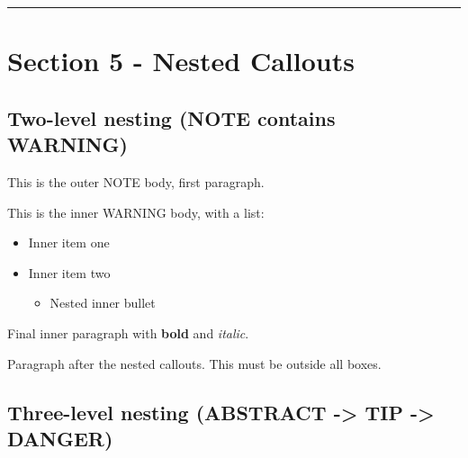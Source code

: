 \begin{tcolorbox}[breakable,colback=ocGryBack,colframe=ocGryFrame,coltitle=ocGryTitle,left=3mm,boxed title style={left=1mm},title={\hspace*{-2.5mm}\iconInfo\; md2pdf - inner with explicit \texttt{shift-heading=0}}]
\begin{center}\rule{0.5\linewidth}{0.5pt}\end{center}

\section*{Section 5 - Nested
Callouts}\label{inner-3-section-5---nested-callouts}

\subsection*{Two-level nesting (NOTE contains
WARNING)}\label{inner-3-two-level-nesting-note-contains-warning}

\begin{tcolorbox}[breakable,colback=ocGryBack,colframe=ocGryFrame,coltitle=ocGryTitle,left=3mm,boxed title style={left=1mm},title={\hspace*{-2.5mm}\iconNote\; Outer NOTE title}]

This is the outer NOTE body, first paragraph.

\begin{tcolorbox}[breakable,colback=ocOrgBack,colframe=ocOrgFrame,coltitle=ocOrgTitle,left=3mm,boxed title style={left=1mm},title={\hspace*{-2.5mm}\iconWarning\; Inner WARNING title}]

This is the inner WARNING body, with a list:

\begin{itemize}
\tightlist
\item
  Inner item one
\item
  Inner item two

  \begin{itemize}
  \tightlist
  \item
    Nested inner bullet
  \end{itemize}
\end{itemize}

Final inner paragraph with \textbf{bold} and \emph{italic}.

\end{tcolorbox}

\end{tcolorbox}

Paragraph after the nested callouts. This must be outside all boxes.

\subsection*{Three-level nesting (ABSTRACT -\textgreater{} TIP
-\textgreater{}
DANGER)}\label{inner-3-three-level-nesting-abstract---tip---danger}


\end{tcolorbox}
